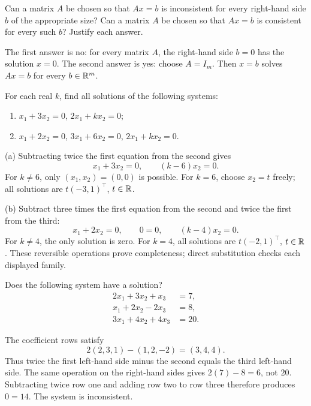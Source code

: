 \begin{problem}\label{ex:01:universal-right-hand-sides}
Can a matrix $A$ be chosen so that $Ax=b$ is inconsistent for every
right-hand side $b$ of the appropriate size?
Can a matrix $A$ be chosen so that $Ax=b$ is consistent for every such
$b$? Justify each answer.
\end{problem}
\begin{solution}
The first answer is no: for every matrix $A$, the right-hand side $b=0$
has the solution $x=0$.
The second answer is yes: choose $A=I_m$. Then $x=b$ solves $Ax=b$
for every $b\in\mathbb R^m$.
\end{solution}

\begin{problem}\label{ex:01:homogeneous-parameter-systems}
For each real $k$, find all solutions of the following systems:
\begin{enumerate}
\item $x_1+3x_2=0$, \quad $2x_1+kx_2=0$;
\item $x_1+2x_2=0$, \quad $3x_1+6x_2=0$, \quad $2x_1+kx_2=0$.
\end{enumerate}
\end{problem}
\begin{solution}
(a) Subtracting twice the first equation from the second gives
\[
x_1+3x_2=0,\qquad (k-6)x_2=0.
\]
For $k\ne6$, only $(x_1,x_2)=(0,0)$ is possible.
For $k=6$, choose $x_2=t$ freely; all solutions are
$t(-3,1)^\top$, $t\in\mathbb R$.

(b) Subtract three times the first equation from the second and twice
the first from the third:
\[
x_1+2x_2=0,\qquad 0=0,\qquad (k-4)x_2=0.
\]
For $k\ne4$, the only solution is zero. For $k=4$, all solutions
are $t(-2,1)^\top$, $t\in\mathbb R$.
These reversible operations prove completeness; direct substitution
checks each displayed family.
\end{solution}

\begin{problem}\label{ex:01:inconsistent-three-equations}
Does the following system have a solution?
\[
\begin{aligned}
2x_1+3x_2+x_3&=7,\\
x_1+2x_2-2x_3&=8,\\
3x_1+4x_2+4x_3&=20.
\end{aligned}
\]
\end{problem}
\begin{solution}
The coefficient rows satisfy
\[
2(2,3,1)-(1,2,-2)=(3,4,4).
\]
Thus twice the first left-hand side minus the second equals the third
left-hand side. The same operation on the right-hand sides gives
$2(7)-8=6$, not $20$. Subtracting twice row one and adding row two to
row three therefore produces $0=14$. The system is inconsistent.
\end{solution}


